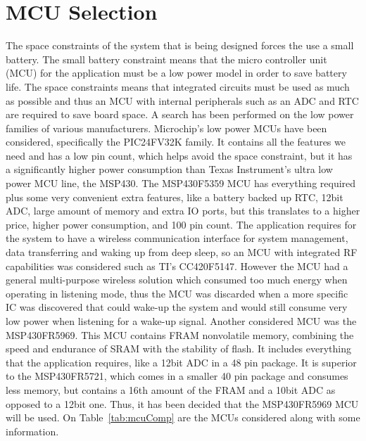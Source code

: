 \section{MCU Selection}
The space constraints of the system that is being designed forces the use a small battery. The small battery constraint means that the micro controller unit (MCU) for the application must be a low power model in order to save battery life. The space constraints means that integrated circuits must be used as much as possible and thus an MCU with internal peripherals such as an ADC and RTC are required to save board space. A search has been performed on the low power families of various manufacturers. Microchip’s low power MCUs have been considered, specifically the PIC24FV32K family. It contains all the features we need and has a low pin count, which helps avoid the space constraint, but it has a significantly higher power consumption than Texas Instrument's ultra low power MCU line, the MSP430. The MSP430F5359 MCU has everything required plus some very convenient extra features, like a battery backed up RTC, 12bit ADC, large amount of memory and extra IO ports, but this translates to a higher price, higher power consumption, and 100 pin count. The application requires for the system to have a wireless communication interface for system management, data transferring and waking up from deep sleep, so an MCU with integrated RF capabilities was considered such as TI’s CC420F5147. However the MCU had a general multi-purpose wireless solution which consumed too much energy when operating in listening mode, thus the MCU was discarded when a more specific IC was discovered that could wake-up the system and would still consume very low power when listening for a wake-up signal. Another considered MCU was the MSP430FR5969. This MCU contains FRAM nonvolatile memory, combining the speed and endurance of SRAM with the stability of flash. It includes everything that the application requires, like a 12bit ADC in a 48 pin package. It is superior to the MSP430FR5721, which comes in a smaller 40 pin package and consumes less memory, but contains a 16th amount of the FRAM and a 10bit ADC as opposed to a 12bit one. Thus, it has been decided that the MSP430FR5969 MCU will be used. On Table~\ref{tab:mcuComp} are the MCUs considered along with some information.
